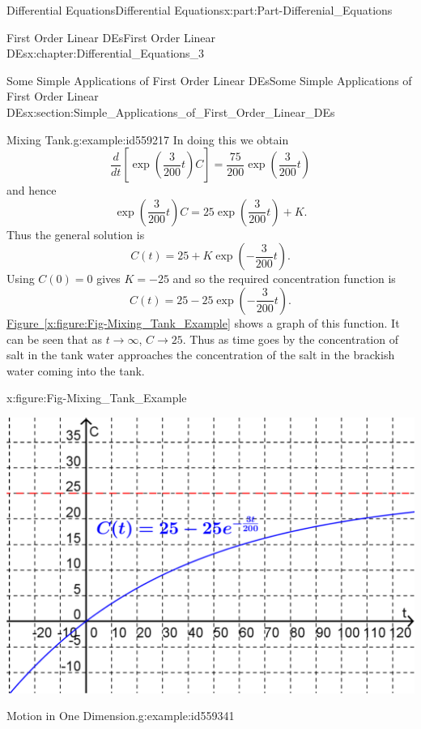 \documentclass[oneside,10pt,]{book}
\newcommand{\xreffont}{\relax}
\numberwithin{equation}{section}
\begin{document}
\begin{partptx}{Differential Equations}{}{Differential Equations}{}{}{x:part:Part-Differenial_Equations}
\begin{chapterptx}{First Order Linear DEs}{}{First Order Linear DEs}{}{}{x:chapter:Differential_Equations_3}
\begin{sectionptx}{Some Simple Applications of First Order Linear DEs}{}{Some Simple Applications of First Order Linear DEs}{}{}{x:section:Simple_Applications_of_First_Order_Linear_DEs}
\begin{example}{Mixing Tank.}{g:example:id559217}
In doing this we obtain%
\begin{equation*}
\dfrac{d}{dt} \left[ \exp \left(\dfrac{3}{200} t \right) C \right] = \frac{75}{200} \exp \left( \dfrac{3}{200} t \right)
\end{equation*}
and hence%
\begin{equation*}
\exp \left(\dfrac{3}{200}t \right) C = 25 \exp \left(\dfrac{3}{200}t \right) + K.
\end{equation*}
Thus the general solution is%
\begin{equation*}
C(t) = 25 + K \exp\left( - \dfrac{3}{200} t \right)\text{.}
\end{equation*}
Using \(C(0) = 0\) gives \(K = -25\) and so the required concentration function is%
\begin{equation*}
C(t) = 25 - 25 \exp \left(- \dfrac{3}{200}t \right)\text{.}
\end{equation*}
\hyperref[x:figure:Fig-Mixing_Tank_Example]{Figure~{\xreffont\ref{x:figure:Fig-Mixing_Tank_Example}}} shows a graph of this function. It can be seen that as \(t \to \infty\), \(C \to 25\). Thus as time goes by the concentration of salt in the tank water approaches the concentration of the salt in the brackish water coming into the tank.%
\begin{figureptx}{}{x:figure:Fig-Mixing_Tank_Example}{}%
\begin{image}{0.15}{0.7}{0.15}%
\includegraphics[width=\linewidth]{./DifferentialEquations/Images/3/Fig1_Mixing_Tank.png}
\end{image}%
\tcblower
\end{figureptx}%
\end{example}
\begin{example}{Motion in One Dimension.}{g:example:id559341}%

\end{example}
\end{sectionptx}
\end{chapterptx}
\end{partptx}
\end{document}
